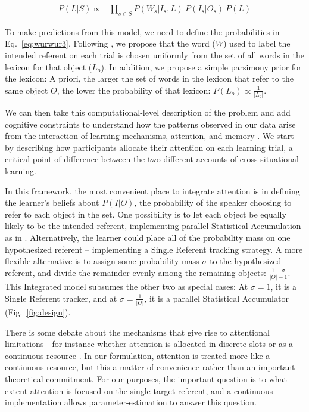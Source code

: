 \documentclass{pnastwo}
\begin{document}
\begin{article}
\begin{align}
P(L|S) \propto & \prod\limits_{s\in{S}}P(W_{s}| I_{s}, L) \: P(I_{s}|O_{s})  \: P(L) \label{eq:wurwur3}
\end{align}

To make predictions from this model, we need to define the probabilities in Eq.~\ref{eq:wurwur3}. Following \citep{Frank2009a}, we propose that the word ($W$) used to label the intended referent on each trial is chosen uniformly from the set of all words in the lexicon for that object ($L_{o}$). In addition, we propose a simple parsimony prior for the lexicon: A priori, the larger the set of words in the lexicon that refer to the same object $O$, the lower the probability of that lexicon: $P(L_{o}) \propto \frac{1}{|L_{o}|}$. 

We can then take this computational-level description of the problem and add cognitive constraints to understand how the patterns observed in our data arise from the interaction of learning mechanisms, attention, and memory \citep[see e.g.,][]{Frank2010a, Shi2010}. We start by describing how participants allocate their attention on each learning trial, a critical point of difference between the two different accounts of cross-situational learning. 

In this framework, the most convenient place to integrate attention is in defining the learner's beliefs about $P(I|O)$, the probability of the speaker choosing to refer to each object in the set. One possibility is to let each object be equally likely to be the intended referent, implementing parallel Statistical Accumulation as in \citep{Frank2009a}. Alternatively, the learner could place all of the probability mass on one hypothesized referent -- implementing a Single Referent tracking strategy. A more flexible alternative is to assign some probability mass $\sigma$ to the hypothesized referent, and divide the remainder evenly among the remaining objects: $\frac{1-\sigma}{|O|-1}$. This Integrated model subsumes the other two as special cases: At $\sigma=1$, it is a Single Referent tracker, and at $\sigma=\frac{1}{|O|}$, it is a parallel Statistical Accumulator (Fig.~\ref{fig:design}). 

There is some debate about the mechanisms that give rise to attentional limitations---for instance whether attention is allocated in discrete slots or as a continuous resource \citep{Luck1997, Wei2012}. In our formulation, attention is treated more like a continuous resource, but this a matter of convenience rather than an important theoretical commitment. For our purposes, the important question is to what extent attention is focused on the single target referent, and a continuous implementation allows parameter-estimation to answer this question.


\end{article}
\end{document}
